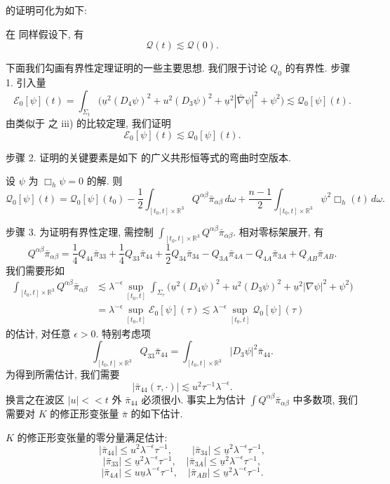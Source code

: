  的证明可化为如下:
\setcounter{mtthm}{15}
\begin{theorem}[有界性定理]\label{thm:3.16}
在 同样假设下, 有
\[
\mathcal{Q}(t)\lesssim\mathcal{Q}(0).
\]
\end{theorem}

下面我们勾画有界性定理证明的一些主要思想. 我们限于讨论 $Q_{0}$ 的有界性.
步骤 1. 引入量
\[
\mathcal{E}_{0}[\psi](t)=\int_{\Sigma_{t}}\bigl(\underline{u}^{2}(D_{4}\psi)^{2}+u^{2}(D_{3}\psi)^{2}+\underline{u}^{2}|\bar{\nabla}\psi|^{2}+\psi^{2}\bigr)\lesssim\mathcal{Q}_{0}[\psi](t).
\]
由类似于 之 iii) 的比较定理, 我们证明
\[
\mathcal{E}_{0}[\psi](t)\lesssim\mathcal{Q}_{0}[\psi](t).
\]

步骤 2.  证明的关键要素是如下 的广义共形恒等式的弯曲时空版本.
\setcounter{mtthm}{16}
\begin{proposition}[广义共形恒等式]\label{prop:3.17}
设 $\psi$ 为 $\Box_h \psi = 0$ 的解. 则
\[
\mathcal{Q}_{0}[\psi](t)=\mathcal{Q}_{0}[\psi](t_{0})-\frac{1}{2}\int_{[t_{0},t]\times\mathbb{R}^{3}}Q^{\alpha\beta}\bar{\pi}_{\alpha\beta}\,d\omega+\frac{n-1}{2}\int_{[t_{0},t]\times\mathbb{R}^{3}}\psi^{2}\Box_{h}(t)\,d\omega.
\]
\end{proposition}

步骤 3. 为证明有界性定理, 需控制 $\int_{[t_0,t]\times\mathbb{R}^3}Q^{\alpha\beta}\bar{\pi}_{\alpha\beta}$. 相对零标架展开, 有
\[
Q^{\alpha\beta}\bar{\pi}_{\alpha\beta}
=\frac{1}{4}Q_{44}\bar{\pi}_{33}+\frac{1}{4}Q_{33}\bar{\pi}_{44}+\frac{1}{2}Q_{34}\bar{\pi}_{34}
-Q_{3A}\bar{\pi}_{4A}-Q_{4A}\bar{\pi}_{3A}+Q_{A B}\bar{\pi}_{A B}.
\]
我们需要形如
\begin{align*}
\int_{[t_{0},t]\times\mathbb{R}^{3}}Q^{\alpha\beta}\bar{\pi}_{\alpha\beta}
&\lesssim\lambda^{-\epsilon}\sup_{[t_{0},t]}\int_{\Sigma_{\tau}}\bigl(\underline{u}^{2}(D_{4}\psi)^{2}+u^{2}(D_{3}\psi)^{2}+\underline{u}^{2}|\nabla\psi|^{2}+\psi^{2}\bigr)\\
&=\lambda^{-\epsilon}\sup_{[t_{0},t]}\mathcal{E}_{0}[\psi](\tau)\lesssim\lambda^{-\epsilon}\sup_{[t_{0},t]}\mathcal{Q}_{0}[\psi](\tau)
\end{align*}
的估计, 对任意 $\epsilon > 0$. 特别考虑项
\[
\int_{[t_{0},t]\times\mathbb{R}^{3}}Q_{33}\bar{\pi}_{44}=\int_{[t_{0},t]\times\mathbb{R}^{3}}\left|D_{3}\psi\right|^{2}\bar{\pi}_{44}.
\]
为得到所需估计, 我们需要
\[
|\bar{\pi}_{44}(\tau,\cdot)|\lesssim u^{2}\tau^{-1}\lambda^{-\epsilon}.
\]
换言之在波区 $|u| << t$ 外 $\bar{\pi}_{44}$ 必须很小. 事实上为估计 $\int Q^{\alpha\beta}\bar{\pi}_{\alpha\beta}$ 中多数项, 我们需要对 $K$ 的修正形变张量 $\bar{\pi}$ 的如下估计.
\setcounter{mtthm}{17}
\begin{proposition}\label{prop:3.18}
$K$ 的修正形变张量的零分量满足估计:
\[
|\bar{\pi}_{44}|\leq u^{2}\lambda^{-\epsilon}\tau^{-1},\qquad|\bar{\pi}_{34}|\leq\underline{u}^{2}\lambda^{-\epsilon}\tau^{-1},
\]
\[
|\bar{\pi}_{33}|\leq\underline{u}^{2}\lambda^{-\epsilon}\tau^{-1},\quad|\bar{\pi}_{3A}|\leq\underline{u}^{2}\lambda^{-\epsilon}\tau^{-1},
\]
\[
|\bar{\pi}_{4A}|\leq u\underline{u}\lambda^{-\epsilon}\tau^{-1},\quad|\bar{\pi}_{A B}|\leq\underline{u}^{2}\lambda^{-\epsilon}\tau^{-1}.
\]
\end{proposition}

